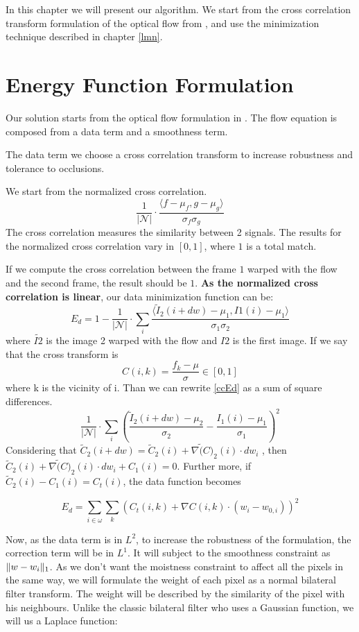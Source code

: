 \documentclass[12pt,a4paper,twoside]{report}
\begin{document}
{In this chapter we will present our algorithm. We start from the cross correlation transform formulation of the optical flow from \cite{drulea2013}, and use the minimization technique described in chapter \ref{lmn}.


\section{Energy Function Formulation}

Our solution starts from the optical flow formulation in \cite{drulea2013}.
The flow equation is composed from a data term and a smoothness term.

The data term we choose a cross correlation transform to increase robustness and tolerance to occlusions. 

We start from the normalized cross correlation. 
$$
\frac{1}{|\mathcal{N}|}\cdot \frac{\langle f - \mu_f , g - \mu_g \rangle}{\sigma_f \sigma_g} 
$$
The cross correlation measures the similarity between 2 signals. The results for the normalized cross correlation vary in $[0,1]$, where $1$ is a total match.

If we compute the cross correlation between the frame $1$ warped with the flow and the second frame, the result should be $1$.\textbf{ As the normalized cross correlation is linear}, our data minimization function can be:
$$ \label{ccEd}
E_d = 1-\frac{1}{|\mathcal{N}|}\cdot \sum_i \frac{\langle \tilde{I}_2(i+dw) - \mu_1 , I1(i) - \mu_1 \rangle}{\sigma_1 \sigma_2} 
$$
where $\tilde{I2} $ is the image 2 warped with the flow and $I2$ is the first image. 
If we say that the cross transform is 
$$
C(i,k) = \frac{f_k-\mu}{\sigma} \in [0,1]
$$
where k is the vicinity of i. Than we can rewrite \ref{ccEd} as a sum of square differences.
$$
\frac{1}{|\mathcal{N}|}\cdot \sum_i( \frac{\tilde{I}_2(i+dw)-\mu_2}{\sigma_2}- \frac{I_1(i)-\mu_1}{\sigma_1})^2
$$
Considering that $\tilde{C}_2(i+dw) = \tilde{C}_2(i) + \nabla\tilde(C)_2(i)\cdot dw_i$ , then $ \tilde{C}_2(i) + \nabla\tilde(C)_2(i)\cdot dw_i + C_1(i) = 0 $. Further more, if $\tilde{C}_2(i) -C_1(i)  = C_t(i)  $, the data function becomes

$$
E_d = \sum_{i \in \omega} \sum_{k}
(C_t(i,k)+ \nabla C(i,k)\cdot(w_i-w_{0,i}))^2
$$


Now, as the data term is in $L^2$, to increase the robustness of the formulation, the correction term will be in $L^1$. It will subject to the smoothness constraint as $\Arrowvert w-w_i\Arrowvert_1$. As we don't want the moistness constraint to affect all the pixels in the same way, we will formulate the weight of each pixel as a normal bilateral filter transform. The weight will be described by the similarity of the pixel with his neighbours. Unlike the classic bilateral filter who uses a Gaussian function, we will us a Laplace function:

}
\end{document}

